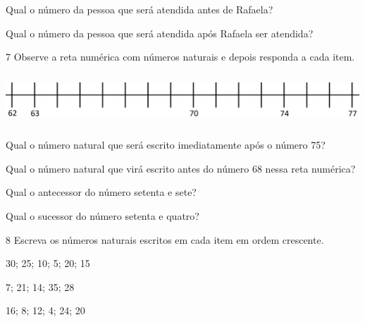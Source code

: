 \begin{escolha}
\begin{escolha}
\item
  Qual o número da pessoa que será atendida antes de Rafaela?

\item
  Qual o número da pessoa que será atendida após Rafaela ser atendida?

\end{escolha}

\num{7} Observe a reta numérica com números naturais e depois responda a cada item.


\includegraphics[width=5.22545in,height=0.75840in]{media/image31.png}

\begin{escolha}

\item
  Qual o número natural que será escrito imediatamente após o número 75?

\item
  Qual o número natural que virá escrito antes do número 68 nessa reta
  numérica?

\item
  Qual o antecessor do número setenta e sete?

\item
  Qual o sucessor do número setenta e quatro?

\end{escolha}

\num{8} Escreva os números naturais escritos em cada item em ordem crescente.

\begin{escolha}

\item
  30; 25; 10; 5; 20; 15

\item
  7; 21; 14; 35; 28

\item
  16; 8; 12; 4; 24; 20


\end{escolha}
\end{escolha}
